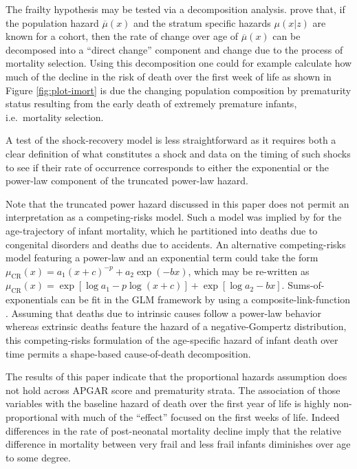\documentclass[10pt, twoside, parskip=half]{article}
\begin{document}
The frailty hypothesis may be tested via a decomposition analysis.
\citet{Vaupel2010a} prove that, if the population hazard
\(\overline\mu(x)\) and the stratum specific hazards \(\mu(x|z)\) are
known for a cohort, then the rate of change over age of
\(\overline\mu(x)\) can be decomposed into a ``direct change'' component
and change due to the process of mortality selection. Using this
decomposition one could for example calculate how much of the decline in
the risk of death over the first week of life as shown in Figure
\ref{fig:plot-imort} is due the changing population composition by
prematurity status resulting from the early death of extremely premature
infants, i.e.~mortality selection.

A test of the shock-recovery model is less straightforward as it
requires both a clear definition of what constitutes a shock and data on
the timing of such shocks to see if their rate of occurrence corresponds
to either the exponential or the power-law component of the truncated
power-law hazard.

Note that the truncated power hazard discussed in this paper does not
permit an interpretation as a competing-risks model. Such a model was
implied by \citet{Bourgeois-Pichat1951} for the age-trajectory of infant
mortality, which he partitioned into deaths due to congenital disorders
and deaths due to accidents. An alternative competing-risks model
featuring a power-law and an exponential term could take the form
\(\mu_\text{CR}(x)=a_1(x+c)^{-p} + a_2\exp(-bx)\), which may be
re-written as
\(\mu_\text{CR}(x)=\exp[\log a_1 - p\log(x+c)] + \exp[\log a_2 - bx]\).
Sums-of-exponentials can be fit in the GLM framework by using a
composite-link-function \citep{Thompson1981, Camarda2016}. Assuming that
deaths due to intrinsic causes follow a power-law behavior whereas
extrinsic deaths feature the hazard of a negative-Gompertz distribution,
this competing-risks formulation of the age-specific hazard of infant
death over time permits a shape-based cause-of-death decomposition.

The results of this paper indicate that the proportional hazards
assumption does not hold across APGAR score and prematurity strata. The
association of those variables with the baseline hazard of death over
the first year of life is highly non-proportional with much of the
``effect'' focused on the first weeks of life. Indeed differences in the
rate of post-neonatal mortality decline imply that the relative
difference in mortality between very frail and less frail infants
diminishes over age to some degree.
\end{document}
